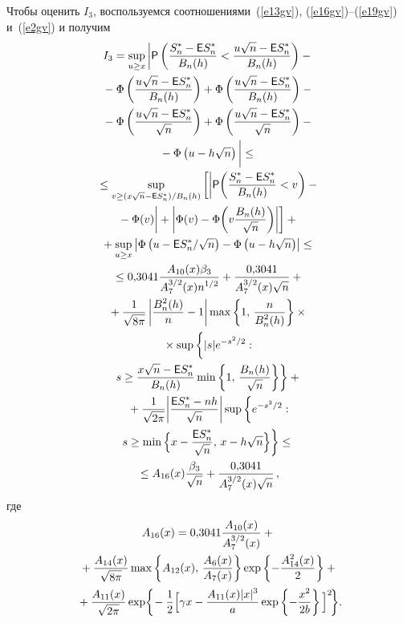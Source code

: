 \begin{multicols}{2}
Чтобы оценить $I_3$, воспользуемся соотношениями~(\ref{e13gv}),
(\ref{e16gv})--(\ref{e19gv}) и~(\ref{e2gv}) и получим
\begin{multline}
I_3=\sup_{u\ge x}\bigg|{\sf P}\left(\fr{S_n^*-{\sf
E}S_n^*}{B_n(h)}<\fr{u\sqrt{n}-{\sf
E}S_n^*}{B_n(h)}\right)-{}\\
{}-\Phi\left(\fr{u\sqrt{n}-{\sf
E}S_n^*}{B_n(h)}\right)+\Phi\left(\fr{u\sqrt{n}-{\sf
E}S_n^*}{B_n(h)}\right)-{}\\
{}-
\Phi\left(\fr{u\sqrt{n}-{\sf
E}S_n^*}{\sqrt{n}}\right)+\Phi\left(\fr{u\sqrt{n}-{\sf
E}S_n^*}{\sqrt{n}}\right)-{}\\
{}-\Phi\left(u-h\sqrt{n}\right)\bigg|\le{}\\
{}\le
\sup_{v\ge(x\sqrt{n}-{\sf E}S_n^*)/B_n(h)}\bigg[\bigg|{\sf
P}\bigg(\fr{S_n^*-{\sf
E}S_n^*}{B_n(h)}<v\bigg)-{}\\
{}-
\Phi(v)\bigg|+\bigg|\Phi(v)-\Phi\bigg(v\fr{B_n(h)}{\sqrt{n}}\bigg)
\bigg|\bigg]+{}\\
{}
+\sup_{u\ge x}\left|\Phi\left(u-{\sf
E}S_n^*/\sqrt{n}\right)-\Phi\left(u-h\sqrt{n}\right)\right|\le{}\\
{}\le
0{,}3041\fr{A_{10}(x)\betr}{A_7^{3/2}(x)n^{\d/2}}+\fr{0{,}3041}{A_7^{3/2}(x)\sqrt{n}}+{}\\
{}
+\fr{1}{\sqrt{8\pi}}\left|\fr{B_n^2(h)}{n}-1\right|\max\left\{1,\,\fr{n}{B_n^2(h)}\right\}\times{}\\
{}\times
\sup\left\{\vphantom{\fr{B_h(h)}{B_h(h)}}
|s|e^{-s^2/2}:\right.\\
\left.s\ge\fr{x\sqrt{n}-{\sf
E}S_n^*}{B_n(h)}\min\left\{1,\,\fr{B_n(h)}{\sqrt{n}}\right\}\right\}+{}\\
{}+
\fr{1}{\sqrt{2\pi}}\bigg|\fr{{\sf
E}S_n^*-nh}{\sqrt{n}}\bigg|
\sup\bigg\{e^{-s^2/2}:\\
s\ge\min\Big\{x-\fr{{\sf
E}S_n^*}{\sqrt{n}},\,x-h\sqrt{n}\Big\}\bigg\}\le{}\\
{}\le
A_{16}(x)\Lo+\fr{0{,}3041}{A_7^{3/2}(x)\sqrt{n}}\,,\label{e21gv}
\end{multline}
где
\begin{multline*}
A_{16}(x)=0{,}3041\displaystyle\frac{\displaystyle A_{10}(x)\mathstrut}{\displaystyle A_7^{3/2}(x)\mathstrut}+{}\\
{}+\displaystyle\frac{\displaystyle A_{14}(x)\mathstrut}{\displaystyle \sqrt{8\pi}\mathstrut}\max\left\{A_{12}(x),\,\displaystyle\frac{\displaystyle A_6(x)\mathstrut}{\displaystyle A_7(x)\mathstrut}\right\}
\exp\left\{-\displaystyle\frac{\displaystyle A_{14}^2(x)\mathstrut}{\displaystyle 2\mathstrut}\right\}+{}\\
{}+
\displaystyle\frac{\displaystyle A_{11}(x)\mathstrut}{\displaystyle \sqrt{2\pi}\mathstrut}\exp\!\bigg\{\!-\displaystyle\frac{\displaystyle 1\mathstrut}{\displaystyle 2\mathstrut}\Big[\gamma
x-\displaystyle\frac{\displaystyle A_{11}(x)|x|^{3}\mathstrut}{\displaystyle a\mathstrut}\exp\left\{-\displaystyle\frac{\displaystyle x^2\mathstrut}{\displaystyle 2b\mathstrut}\right\}\Big]^2\!\bigg\}.\hspace*{-1.467pt}
\end{multline*}


\end{multicols}
